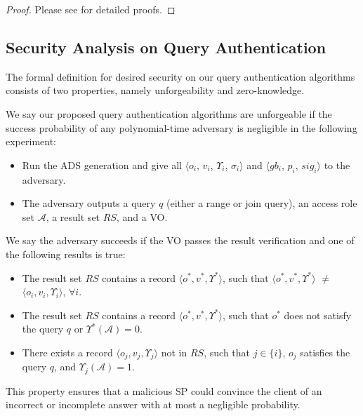 \begin{proof}
  Please see  for detailed proofs.
\end{proof}

\subsection{Security Analysis on Query Authentication}\label{sec:access-control:security-analysis-query}

The formal definition for desired security on our query authentication algorithms consists of two properties, namely unforgeability and zero-knowledge.

\begin{definition}[Unforgeability]\label{def:access-control:query-secure}
  We say our proposed query authentication algorithms are unforgeable if the success probability of any polynomial-time adversary is negligible in the following experiment:
  \begin{itemize}
    \item Run the ADS generation and give all $\langle o_i$, $v_i$, $\Upsilon_i$, $\sigma_i\rangle$ and $\langle gb_i$, $p_i$, $sig_i\rangle$ to the adversary.
    \item The adversary outputs a query $q$ (either a range or join query), an access role set $\mathcal{A}$, a result set $RS$, and a VO\@.
  \end{itemize}
  We say the adversary succeeds if the VO passes the result verification and one of the following results is true:
  \begin{itemize}
    \item The result set $RS$ contains a record $\langle o^*, v^*, \Upsilon^*\rangle$, such that $\langle o^*, v^*, \Upsilon^*\rangle$ $\neq$ $\langle o_i, v_i, \Upsilon_i\rangle$, $\forall i$.
    \item The result set $RS$ contains a record $\langle o^*, v^*, \Upsilon^*\rangle$, such that $o^*$ does not satisfy the query $q$ or $\Upsilon^*(\mathcal{A}) = 0$.
    \item There exists a record $\langle o_j, v_j, \Upsilon_j\rangle$ not in $RS$, such that $j \in \{i\}$, $o_j$ satisfies the query $q$, and $\Upsilon_j(\mathcal{A})= 1$.
  \end{itemize}
\end{definition}

This property ensures that a malicious SP could convince the client of an incorrect or incomplete answer with at most a negligible probability.

